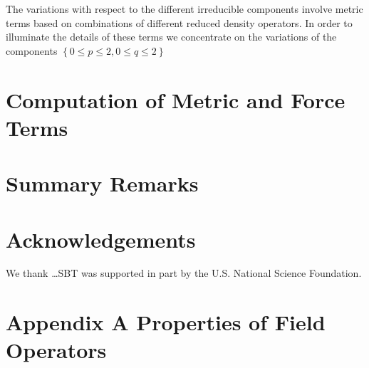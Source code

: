 The variations with respect to the different irreducible components involve
metric terms based on combinations of different reduced density operators.
In order to illuminate the details of these terms we concentrate on the
variations of the components $\left\{ 0\leq p\leq 2,0\leq q\leq 2\right\} $

\section{Computation of Metric and Force Terms}

\section{Summary Remarks}

\section{Acknowledgements}

We thank \ldots SBT was supported in part by the U.S. National Science
Foundation.

\section{Appendix A Properties of Field Operators}

